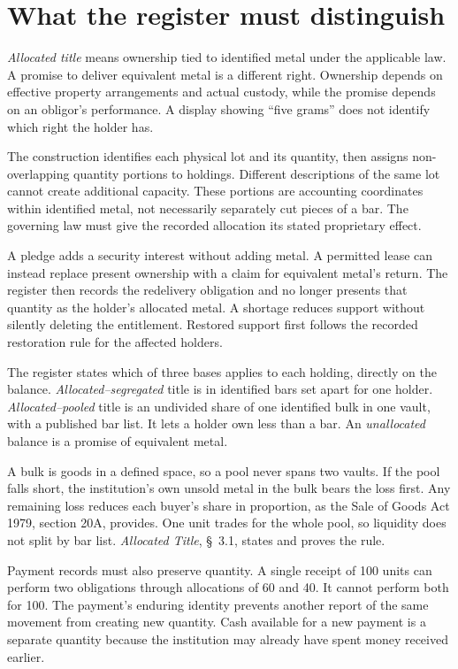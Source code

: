 \documentclass{momentum}
\begin{document}
\section{What the register must distinguish}

\emph{Allocated title} means ownership tied to identified metal under the applicable law. A promise to deliver equivalent metal is a different right. Ownership depends on effective property arrangements and actual custody, while the promise depends on an obligor's performance. A display showing ``five grams'' does not identify which right the holder has.

The construction identifies each physical lot and its quantity, then assigns non-overlapping quantity portions to holdings. Different descriptions of the same lot cannot create additional capacity. These portions are accounting coordinates within identified metal, not necessarily separately cut pieces of a bar. The governing law must give the recorded allocation its stated proprietary effect.

A pledge adds a security interest without adding metal. A permitted lease can instead replace present ownership with a claim for equivalent metal's return. The register then records the redelivery obligation and no longer presents that quantity as the holder's allocated metal. A shortage reduces support without silently deleting the entitlement. Restored support first follows the recorded restoration rule for the affected holders.

The register states which of three bases applies to each holding, directly on the balance. \emph{Allocated--segregated} title is in identified bars set apart for one holder. \emph{Allocated--pooled} title is an undivided share of one identified bulk in one vault, with a published bar list. It lets a holder own less than a bar. An \emph{unallocated} balance is a promise of equivalent metal.

A bulk is goods in a defined space, so a pool never spans two vaults. If the pool falls short, the institution's own unsold metal in the bulk bears the loss first. Any remaining loss reduces each buyer's share in proportion, as the Sale of Goods Act 1979, section 20A, provides. One unit trades for the whole pool, so liquidity does not split by bar list. \emph{Allocated Title}, \S~3.1, states and proves the rule.

Payment records must also preserve quantity. A single receipt of 100 units can perform two obligations through allocations of 60 and 40. It cannot perform both for 100. The payment's enduring identity prevents another report of the same movement from creating new quantity. Cash available for a new payment is a separate quantity because the institution may already have spent money received earlier.
\end{document}
